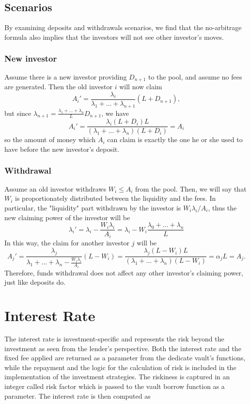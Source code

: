 \documentclass[a4paper,10 pt]{article}
\theoremstyle{definition}
\begin{document}
\subsection{Scenarios}
By examining deposits and withdrawals scenarios, we find that the no-arbitrage formula also implies that the investors will not see other investor's moves.
\subsubsection{New investor}
Assume there is a new investor providing $D_{n+1}$ to the pool, and assume no fees are generated. Then the old investor $i$ will now claim $$A_i' = \frac{\lambda_i}{\lambda_1+\ldots + \lambda_{n+1}}(L+D_{n+1}),$$ but since $\lambda_{n+1} = \frac{\lambda_1+\ldots+\lambda_n}{L}D_{n+1}$, we have $$A_i' = \frac{\lambda_i(L+D_i)L}{(\lambda_1+\ldots+\lambda_n)(L+D_i)} = A_i$$ so the amount of money which $A_i$ can claim is exactly the one he or she used to have before the new investor's deposit.

\subsubsection{Withdrawal}
Assume an old investor withdraws $W_i \le A_i$ from the pool. Then, we will say that $W_i$ is proportionately distributed between the liquidity and the fees. In particular, the "liquidity" part withdrawn by the investor is $W_i\lambda_i/A_i$, thus the new claiming power of the investor will be $$\lambda_i' = \lambda_i - \frac{W_i\lambda_i}{A_i}=\lambda_i-W_i\frac{\lambda_0+\ldots+\lambda_n}{L}$$ In this way, the claim for another investor $j$ will be $$A_j' = \frac{\lambda_j}{\lambda_1+\ldots+\lambda_n - \frac{W_i\lambda_i}{A_i}}(L-W_i) = \frac{\lambda_j(L-W_i)L}{(\lambda_1+\ldots+\lambda_n)(L-W_i)} = \alpha_jL = A_j. $$ Therefore, funds withdrawal does not affect any other investor's claiming power, just like deposits do.

\section{Interest Rate}

The interest rate is investment-specific and represents the risk beyond the investment as seen from the lender's perspective.
Both the interest rate and the fixed fee applied are returned as a parameter from the dedicate vault’s functions, while the repayment and the logic for the calculation of risk is included in the implementation of the investment strategies. The riskiness is captured in an integer called risk factor which is passed to the vault borrow function as a parameter. The interest rate is then computed as
\end{document}
